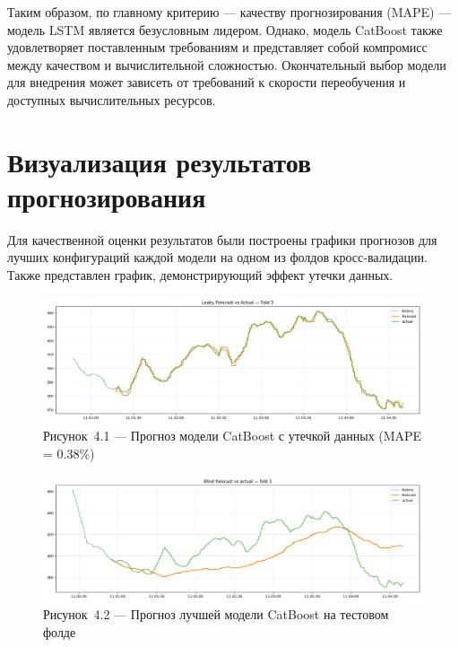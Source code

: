 Таким образом, по главному критерию — качеству прогнозирования (MAPE) — модель LSTM является безусловным лидером. Однако, модель CatBoost также удовлетворяет поставленным требованиям и представляет собой компромисс между качеством и вычислительной сложностью. Окончательный выбор модели для внедрения может зависеть от требований к скорости переобучения и доступных вычислительных ресурсов.

\section{Визуализация результатов прогнозирования}
\label{sec:viz_results}

Для качественной оценки результатов были построены графики прогнозов для лучших конфигураций каждой модели на одном из фолдов кросс-валидации. Также представлен график, демонстрирующий эффект утечки данных.

\begin{figure}[H]
	\centering
	\includegraphics[width=\textwidth]{figures/chapter4/catboost_leakage_forecast.png}
	\caption*{Рисунок~4.1 — Прогноз модели CatBoost с утечкой данных (MAPE = 0.38\%)}
	\label{fig:catboost_leakage_forecast}
\end{figure}

\begin{figure}[H]
	\centering
	\includegraphics[width=\textwidth]{figures/chapter4/catboost_forecast.png}
	\caption*{Рисунок~4.2 — Прогноз лучшей модели CatBoost на тестовом фолде}
	\label{fig:catboost_forecast}
\end{figure}

